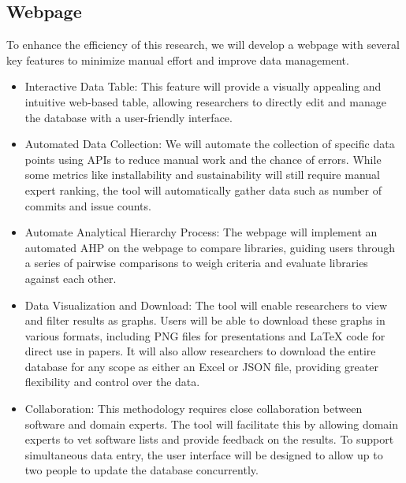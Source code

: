 \documentclass{article}
\begin{document}
\subsection{Webpage}
To enhance the efficiency of this research, we will develop a webpage with several key features to minimize manual effort and improve data management.
\begin{itemize}
    \item Interactive Data Table: This feature will provide a visually appealing and intuitive web-based table, allowing researchers to directly edit and manage the database with a user-friendly interface.
    \item Automated Data Collection: We will automate the collection of specific data points using APIs to reduce manual work and the chance of errors. While some metrics like installability and sustainability will still require manual expert ranking, the tool will automatically gather data such as number of commits and issue counts.
    \item Automate Analytical Hierarchy Process: The webpage will implement an automated AHP on the webpage to compare libraries, guiding users through a series of pairwise comparisons to weigh criteria and evaluate libraries against each other.
    \item Data Visualization and Download: The tool will enable researchers to view and filter results as graphs. Users will be able to download these graphs in various formats, including PNG files for presentations and LaTeX code for direct use in papers. It will also allow researchers to download the entire database for any scope as either an Excel or JSON file, providing greater flexibility and control over the data.
    \item Collaboration: This methodology requires close collaboration between software and domain experts. The tool will facilitate this by allowing domain experts to vet software lists and provide feedback on the results. To support simultaneous data entry, the user interface will be designed to allow up to two people to update the database concurrently.
\end{itemize}
\end{document}
